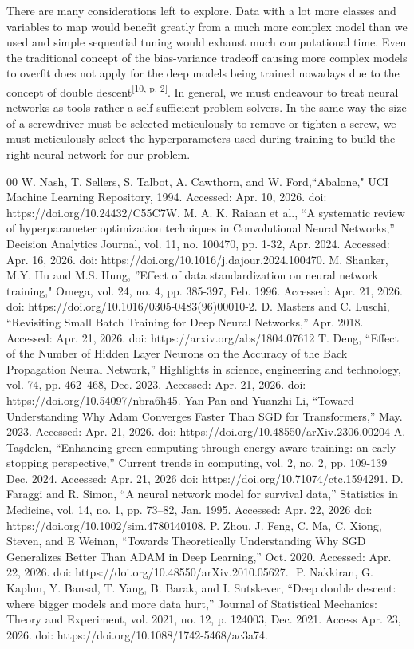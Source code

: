 \documentclass[conference]{IEEEtran}
\begin{document}
There are many considerations left to explore. Data with a lot more classes and variables to map would benefit greatly from a much more complex model than we used and simple sequential tuning would exhaust much computational time. Even the traditional concept of the bias-variance tradeoff causing more complex models to overfit does not apply for the deep models being trained nowadays due to the concept of double descent\textsuperscript{[10, p. 2]}. In general, we must endeavour to treat neural networks as tools rather a self-sufficient problem solvers. In the same way the size of a screwdriver must be selected meticulously to remove or tighten a screw, we must meticulously select the hyperparameters used during training to build the right neural network for our problem.



\begin{thebibliography}{00}
 W. Nash, T. Sellers, S. Talbot, A. Cawthorn, and W. Ford,``Abalone," UCI Machine Learning Repository, 1994. Accessed: Apr. 10, 2026. doi: https://doi.org/10.24432/C55C7W.
 M. A. K. Raiaan et al., “A systematic review of hyperparameter optimization techniques in Convolutional Neural Networks,” Decision Analytics Journal, vol. 11, no. 100470, pp. 1-32, Apr. 2024. Accessed: Apr. 16, 2026. doi: https://doi.org/10.1016/j.dajour.2024.100470.
 M. Shanker, M.Y. Hu and M.S. Hung, ''Effect of data standardization on neural network training," Omega, vol. 24, no. 4, pp. 385-397, Feb. 1996. Accessed: Apr. 21, 2026. doi: https://doi.org/10.1016/0305-0483(96)00010-2.
 D. Masters and C. Luschi, “Revisiting Small Batch Training for Deep Neural Networks,” Apr. 2018. Accessed: Apr. 21, 2026. doi: https://arxiv.org/abs/1804.07612
 T. Deng, “Effect of the Number of Hidden Layer Neurons on the Accuracy of the Back Propagation Neural Network,” Highlights in science, engineering and technology, vol. 74, pp. 462–468, Dec. 2023. Accessed: Apr. 21, 2026. doi: https://doi.org/10.54097/nbra6h45.
 Yan Pan and Yuanzhi Li, “Toward Understanding Why Adam Converges Faster Than SGD for Transformers,” May. 2023. Accessed: Apr. 21, 2026. doi: https://doi.org/10.48550/arXiv.2306.00204
 A. Taşdelen, “Enhancing green computing through energy-aware training: an early stopping perspective,” Current trends in computing, vol. 2, no. 2, pp. 109-139 Dec. 2024. Accessed: Apr. 21, 2026 doi: https://doi.org/10.71074/ctc.1594291.
 D. Faraggi and R. Simon, “A neural network model for survival data,” Statistics in Medicine, vol. 14, no. 1, pp. 73–82, Jan. 1995. Accessed: Apr. 22, 2026 doi: https://doi.org/10.1002/sim.4780140108.
 P. Zhou, J. Feng, C. Ma, C. Xiong, Steven, and E Weinan, “Towards Theoretically Understanding Why SGD Generalizes Better Than ADAM in Deep Learning,” Oct. 2020. Accessed: Apr. 22, 2026. doi: 
https://doi.org/10.48550/arXiv.2010.05627.
‌ P. Nakkiran, G. Kaplun, Y. Bansal, T. Yang, B. Barak, and I. Sutskever, “Deep double descent: where bigger models and more data hurt,” Journal of Statistical Mechanics: Theory and Experiment, vol. 2021, no. 12, p. 124003, Dec. 2021. Access Apr. 23, 2026. doi: https://doi.org/10.1088/1742-5468/ac3a74.
\end{thebibliography}
\end{document}
